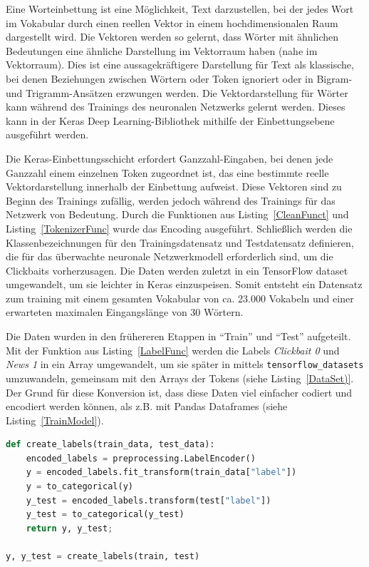 
Eine Worteinbettung ist eine Möglichkeit, Text darzustellen, bei der jedes Wort im Vokabular durch einen reellen Vektor in einem hochdimensionalen Raum dargestellt wird. Die Vektoren werden so gelernt, dass Wörter mit ähnlichen Bedeutungen eine ähnliche Darstellung im Vektorraum haben (nahe im Vektorraum). Dies ist eine aussagekräftigere Darstellung für Text als klassische, bei denen Beziehungen zwischen Wörtern oder Token ignoriert oder in Bigram- und Trigramm-Ansätzen erzwungen werden. Die Vektordarstellung für Wörter kann während des Trainings des neuronalen Netzwerks gelernt werden. Dieses kann in der Keras Deep Learning-Bibliothek mithilfe der Einbettungsebene ausgeführt werden. 


Die Keras-Einbettungsschicht erfordert Ganzzahl-Eingaben, bei denen jede Ganzzahl einem einzelnen Token zugeordnet ist, das eine bestimmte reelle Vektordarstellung innerhalb der Einbettung aufweist. Diese Vektoren sind zu Beginn des Trainings zufällig, werden jedoch während des Trainings für das Netzwerk von Bedeutung. Durch die Funktionen aus Listing~\ref{CleanFunct} und Listing~\ref{TokenizerFunc} wurde das Encoding ausgeführt. Schließlich werden die Klassenbezeichnungen für den Trainingsdatensatz und Testdatensatz definieren, die für das überwachte neuronale Netzwerkmodell erforderlich sind, um die Clickbaits vorherzusagen. Die Daten werden zuletzt in ein TensorFlow dataset umgewandelt, um sie leichter in Keras einzuspeisen. Somit entsteht ein Datensatz zum training mit einem gesamten Vokabular von ca. 23.000 Vokabeln und einer erwarteten maximalen Eingangslänge von 30 Wörtern.

Die Daten wurden in den frühereren Etappen in \enquote{Train} und \enquote{Test} aufgeteilt. Mit der Funktion aus Listing~\ref{LabelFunc} werden die Labels \textit{Clickbait 0} und  \textit{News 1} in ein Array umgewandelt, um sie später in mittels \texttt{tensorflow\_datasets} umzuwandeln, gemeinsam mit den Arrays der Tokens (siehe Listing~\ref{DataSet)}. Der Grund für diese Konversion ist, dass diese Daten viel einfacher codiert und encodiert werden können, als z.B. mit Pandas Dataframes (siehe Listing~\ref{TrainModel}).


\begin{lstlisting}[language=Python,caption=Die Label-Funktion, label={LabelFunc}]
def create_labels(train_data, test_data):
    encoded_labels = preprocessing.LabelEncoder()
    y = encoded_labels.fit_transform(train_data["label"])
    y = to_categorical(y)
    y_test = encoded_labels.transform(test["label"])
    y_test = to_categorical(y_test)
    return y, y_test;

y, y_test = create_labels(train, test)
\end{lstlisting}

